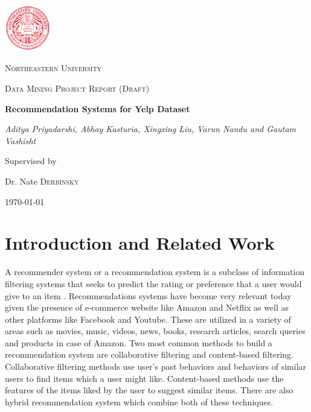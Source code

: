 \documentclass[11pt]{article}
\begin{document}
	\begin{titlepage}
		\centering
		\includegraphics[width=0.15\textwidth]{NU_logo.png}\par\vspace{1cm}
		{\scshape\LARGE Northeastern University \par}
		\vspace{1cm}
		{\scshape\Large Data Mining Project Report (Draft)\par}
		\vspace{1.5cm}
		{\huge\bfseries Recommendation Systems for Yelp Dataset\par}
		\vspace{2cm}
		{\Large\itshape Aditya Priyadarshi, Abhay Kasturia, Xingxing Liu, Varun Nandu and Gautam Vashisht \par}
		\vfill
		Supervised by\par
		Dr. Nate \textsc{Derbinsky}
		
		\vfill
		
		{\large \today\par}
	\end{titlepage}
	
	\section{Introduction and Related Work}
		A recommender system or a recommendation system is a subclass of information filtering systems that seeks to predict the rating or preference that a user would give to an item \cite{rsw}. Recommendations systems have become very relevant today given the presence of e-commerce website like Amazon and Netflix as well as other platforms like Facebook and Youtube. These are utilized in a variety of areas such as movies, music, videos, news, books, research articles, search queries and products in case of Amazon. Two most common methods to build a recommendation system are collaborative filtering and content-based filtering. Collaborative filtering methods use user's past behaviors and behaviors of similar users to find items which a user might like. Content-based methods use the features of the items liked by the user to suggest similar items. There are also hybrid recommendation system which combine both of these techniques.
	
\end{document}
